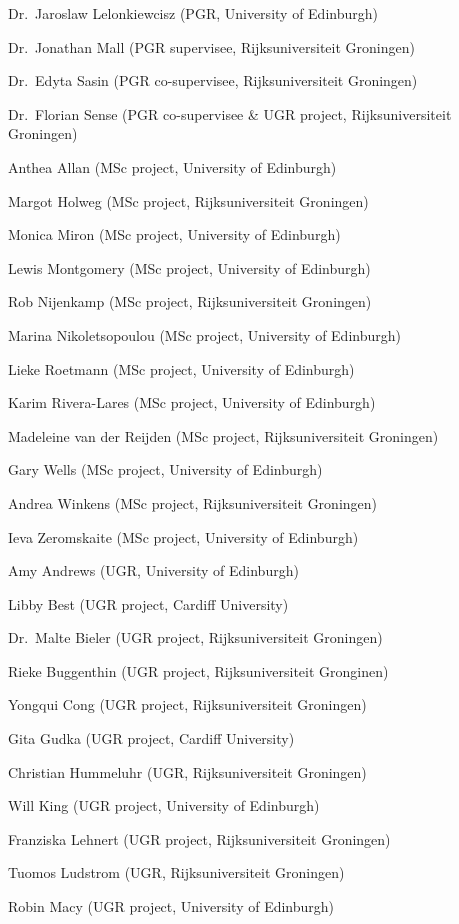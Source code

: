 \documentclass[12pt,]{book}
\theoremstyle{definition}
\theoremstyle{definition}
\theoremstyle{definition}
\theoremstyle{remark}
\begin{document}
Dr.~Jaroslaw Lelonkiewcisz (PGR, University of Edinburgh)

Dr.~Jonathan Mall (PGR supervisee, Rijksuniversiteit Groningen)

Dr.~Edyta Sasin (PGR co-supervisee, Rijksuniversiteit Groningen)

Dr.~Florian Sense (PGR co-supervisee \& UGR project, Rijksuniversiteit
Groningen)

Anthea Allan (MSc project, University of Edinburgh)

Margot Holweg (MSc project, Rijksuniversiteit Groningen)

Monica Miron (MSc project, University of Edinburgh)

Lewis Montgomery (MSc project, University of Edinburgh)

Rob Nijenkamp (MSc project, Rijksuniversiteit Groningen)

Marina Nikoletsopoulou (MSc project, University of Edinburgh)

Lieke Roetmann (MSc project, University of Edinburgh)

Karim Rivera-Lares (MSc project, University of Edinburgh)

Madeleine van der Reijden (MSc project, Rijksuniversiteit Groningen)

Gary Wells (MSc project, University of Edinburgh)

Andrea Winkens (MSc project, Rijksuniversiteit Groningen)

Ieva Zeromskaite (MSc project, University of Edinburgh)

Amy Andrews (UGR, University of Edinburgh)

Libby Best (UGR project, Cardiff University)

Dr.~Malte Bieler (UGR project, Rijksuniversiteit Groningen)

Rieke Buggenthin (UGR project, Rijksuniversiteit Gronginen)

Yongqui Cong (UGR project, Rijksuniversiteit Groningen)

Gita Gudka (UGR project, Cardiff University)

Christian Hummeluhr (UGR, Rijksuniversiteit Groningen)

Will King (UGR project, University of Edinburgh)

Franziska Lehnert (UGR project, Rijksuniversiteit Groningen)

Tuomos Ludstrom (UGR, Rijksuniversiteit Groningen)

Robin Macy (UGR project, University of Edinburgh)
\end{document}
